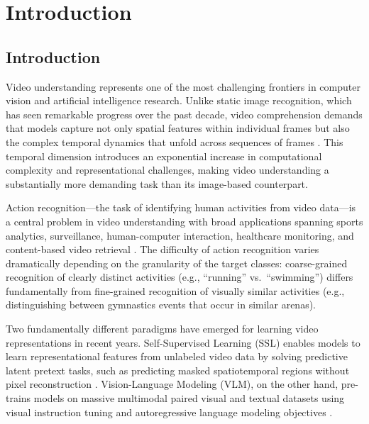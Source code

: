 \chapter{Introduction}

\section{Introduction}

Video understanding represents one of the most challenging frontiers in computer vision and artificial intelligence research. Unlike static image recognition, which has seen remarkable progress over the past decade, video comprehension demands that models capture not only spatial features within individual frames but also the complex temporal dynamics that unfold across sequences of frames \citep{bardes2024vjepa}. This temporal dimension introduces an exponential increase in computational complexity and representational challenges, making video understanding a substantially more demanding task than its image-based counterpart.

Action recognition---the task of identifying human activities from video data---is a central problem in video understanding with broad applications spanning sports analytics, surveillance, human-computer interaction, healthcare monitoring, and content-based video retrieval \citep{bordes2024vlm}. The difficulty of action recognition varies dramatically depending on the granularity of the target classes: coarse-grained recognition of clearly distinct activities (e.g., ``running'' vs.\ ``swimming'') differs fundamentally from fine-grained recognition of visually similar activities (e.g., distinguishing between gymnastics events that occur in similar arenas).

Two fundamentally different paradigms have emerged for learning video representations in recent years. Self-Supervised Learning (SSL) enables models to learn representational features from unlabeled video data by solving predictive latent pretext tasks, such as predicting masked spatiotemporal regions without pixel reconstruction \citep{assran2023ijepa, assran2025vjepa2}. Vision-Language Modeling (VLM), on the other hand, pre-trains models on massive multimodal paired visual and textual datasets using visual instruction tuning and autoregressive language modeling objectives \citep{bordes2024vlm, qwen2025qwen3vl}.

